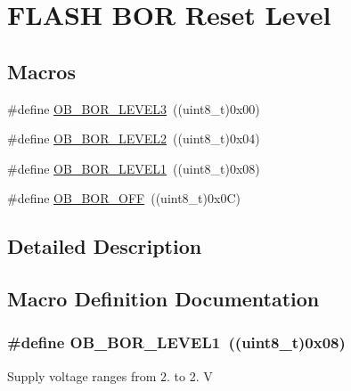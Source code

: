 \hypertarget{group___f_l_a_s_h_ex___b_o_r___reset___level}{}\section{F\+L\+A\+SH B\+OR Reset Level}
\label{group___f_l_a_s_h_ex___b_o_r___reset___level}
\subsection*{Macros}
\begin{DoxyCompactItemize}
\item 
\#define \hyperlink{group___f_l_a_s_h_ex___b_o_r___reset___level_ga3132b8202c0a345e9dd33d136714b046}{O\+B\+\_\+\+B\+O\+R\+\_\+\+L\+E\+V\+E\+L3}~((uint8\+\_\+t)0x00)
\item 
\#define \hyperlink{group___f_l_a_s_h_ex___b_o_r___reset___level_gad678e849fcf817f6ed2d837538e8ebc2}{O\+B\+\_\+\+B\+O\+R\+\_\+\+L\+E\+V\+E\+L2}~((uint8\+\_\+t)0x04)
\item 
\#define \hyperlink{group___f_l_a_s_h_ex___b_o_r___reset___level_ga3a888b788e75f0bc1f9add85c9ccd9d6}{O\+B\+\_\+\+B\+O\+R\+\_\+\+L\+E\+V\+E\+L1}~((uint8\+\_\+t)0x08)
\item 
\#define \hyperlink{group___f_l_a_s_h_ex___b_o_r___reset___level_gaabc231cb1d05a94fe860f67bb5a37b12}{O\+B\+\_\+\+B\+O\+R\+\_\+\+O\+FF}~((uint8\+\_\+t)0x0\+C)
\end{DoxyCompactItemize}


\subsection{Detailed Description}


\subsection{Macro Definition Documentation}
\subsubsection[{\texorpdfstring{O\+B\+\_\+\+B\+O\+R\+\_\+\+L\+E\+V\+E\+L1}{OB_BOR_LEVEL1}}]{\setlength{\rightskip}{0pt plus 5cm}\#define O\+B\+\_\+\+B\+O\+R\+\_\+\+L\+E\+V\+E\+L1~((uint8\+\_\+t)0x08)}\hypertarget{group___f_l_a_s_h_ex___b_o_r___reset___level_ga3a888b788e75f0bc1f9add85c9ccd9d6}{}\label{group___f_l_a_s_h_ex___b_o_r___reset___level_ga3a888b788e75f0bc1f9add85c9ccd9d6}
Supply voltage ranges from 2. to 2. V 
